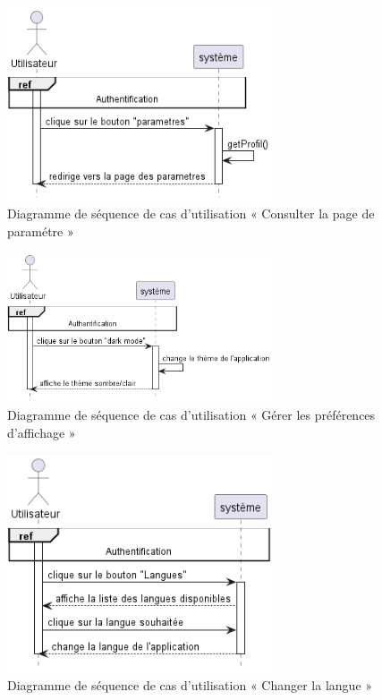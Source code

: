\begin{figure}[H]
  \centering
  \includegraphics[width=0.7\textwidth]{out/diagrams/sprint6/consult_settings_page/consult_settings_page}
  \caption{Diagramme de séquence de cas d'utilisation « Consulter la page de paramétre »}
  \label{fig:sequence_consult_settings_page}
\end{figure}

\begin{figure}[H]
  \centering
  \includegraphics[width=0.7\textwidth]{out/diagrams/sprint6/preferance_affichage/preferance_affichage}
  \caption{Diagramme de séquence de cas d'utilisation « Gérer les préférences d'affichage »}
  \label{fig:sequence_preference_affichage}
\end{figure}


\begin{figure}[H]
  \centering
  \includegraphics[width=0.7\textwidth]{out/diagrams/sprint6/change_language/change_language}
  \caption{Diagramme de séquence de cas d'utilisation « Changer la langue »}
  \label{fig:sequence_change_language}
\end{figure}

